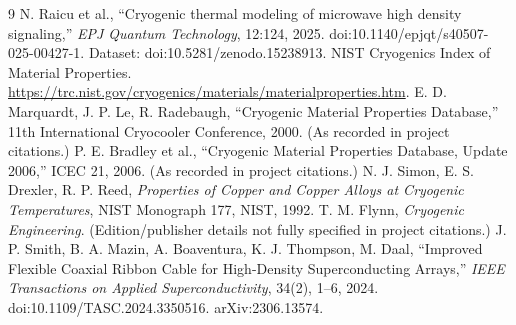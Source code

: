 \documentclass[11pt,a4paper]{article}
\begin{document}
\begin{thebibliography}{9}
 N. Raicu et al., ``Cryogenic thermal modeling of microwave high density signaling,'' \textit{EPJ Quantum Technology}, 12:124, 2025. doi:10.1140/epjqt/s40507-025-00427-1. Dataset: doi:10.5281/zenodo.15238913.
 NIST Cryogenics Index of Material Properties. \url{https://trc.nist.gov/cryogenics/materials/materialproperties.htm}.
 E. D. Marquardt, J. P. Le, R. Radebaugh, ``Cryogenic Material Properties Database,'' 11th International Cryocooler Conference, 2000. (As recorded in project citations.)
 P. E. Bradley et al., ``Cryogenic Material Properties Database, Update 2006,'' ICEC 21, 2006. (As recorded in project citations.)
 N. J. Simon, E. S. Drexler, R. P. Reed, \textit{Properties of Copper and Copper Alloys at Cryogenic Temperatures}, NIST Monograph 177, NIST, 1992.
 T. M. Flynn, \textit{Cryogenic Engineering}. (Edition/publisher details not fully specified in project citations.)
 J. P. Smith, B. A. Mazin, A. Boaventura, K. J. Thompson, M. Daal, ``Improved Flexible Coaxial Ribbon Cable for High-Density Superconducting Arrays,'' \textit{IEEE Transactions on Applied Superconductivity}, 34(2), 1--6, 2024. doi:10.1109/TASC.2024.3350516. arXiv:2306.13574.
\end{thebibliography}
\end{document}
